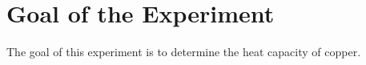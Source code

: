 \section{Goal of the Experiment}
\label{sec:versuchsziel}
The goal of this experiment is to determine the heat capacity of copper.